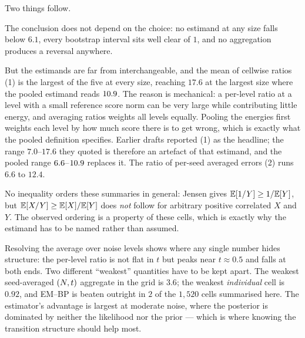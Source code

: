 \noindent Two things follow.

The conclusion does not depend on the choice: no estimand at any size falls
below $6.1$, every bootstrap interval sits well clear of $1$, and no
aggregation produces a reversal anywhere.

But the estimands are far from interchangeable, and the mean of cellwise
ratios (1) is the largest of the five at every size, reaching
$17.6$ at the largest size where the pooled estimand reads
$10.9$. The reason is mechanical: a per-level ratio at a level with a
small reference score norm can be very large while contributing little
energy, and averaging ratios weights all levels equally. Pooling the
energies first weights each level by how much score there is to get wrong,
which is exactly what the pooled definition specifies. Earlier drafts reported
(1) as the headline; the range $7.0$--$17.6$ they quoted is
therefore an artefact of that estimand, and the pooled range
$6.6$--$10.9$ replaces it. The ratio of per-seed averaged
errors (2) runs $6.6$ to $12.4$.

No inequality orders these summaries in general: Jensen gives
$\mathbb{E}[1/Y]\ge 1/\mathbb{E}[Y]$, but $\mathbb{E}[X/Y]\ge\mathbb{E}[X]/\mathbb{E}[Y]$ does \emph{not}
follow for arbitrary positive correlated $X$ and $Y$. The observed ordering
is a property of these cells, which is exactly why the estimand has to be
named rather than assumed.

Resolving the average over noise levels shows where any single number hides
structure: the per-level ratio is not flat in $t$ but peaks near
$t \approx 0.5$ and falls at both ends. Two different ``weakest''
quantities have to be kept apart. The weakest seed-averaged $(N,t)$
aggregate in the grid is $3.6$; the weakest \emph{individual}
cell is $0.92$, and EM--BP is beaten outright in
$2$ of the $1,520$ cells summarised here. The estimator's
advantage is largest at moderate noise, where the posterior is dominated by
neither the likelihood nor the prior --- which is where knowing the
transition structure should help most.
